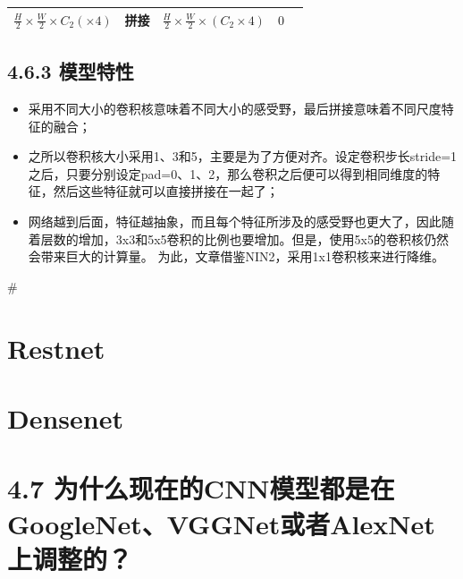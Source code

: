 \begin{longtable}[]{ ccccc }
\begin{minipage}[t]{0.15\columnwidth}
\(\frac{H}{2}\times\frac{W}{2}\times{C_2}(\times4)\)\strut
\end{minipage} & \begin{minipage}[t]{0.17\columnwidth}\centering\strut
拼接\strut
\end{minipage} & \begin{minipage}[t]{0.16\columnwidth}\centering\strut
\(\frac{H}{2}\times\frac{W}{2}\times({C_2}\times4)\)\strut
\end{minipage} & \begin{minipage}[t]{0.22\columnwidth}\centering\strut
\(0\)\strut
\end{minipage}\tabularnewline
\bottomrule
\end{longtable}

\subsection{4.6.3 模型特性}\label{ux6a21ux578bux7279ux6027-4}

\begin{itemize}
\item
  采用不同大小的卷积核意味着不同大小的感受野，最后拼接意味着不同尺度特征的融合；
\item
  之所以卷积核大小采用1、3和5，主要是为了方便对齐。设定卷积步长stride=1之后，只要分别设定pad=0、1、2，那么卷积之后便可以得到相同维度的特征，然后这些特征就可以直接拼接在一起了；
\item
  网络越到后面，特征越抽象，而且每个特征所涉及的感受野也更大了，因此随着层数的增加，3x3和5x5卷积的比例也要增加。但是，使用5x5的卷积核仍然会带来巨大的计算量。
  为此，文章借鉴NIN2，采用1x1卷积核来进行降维。
\end{itemize}

\#

\section{Restnet}\label{restnet}

\section{Densenet}\label{densenet}

\section{4.7
为什么现在的CNN模型都是在GoogleNet、VGGNet或者AlexNet上调整的？}\label{ux4e3aux4ec0ux4e48ux73b0ux5728ux7684cnnux6a21ux578bux90fdux662fux5728googlenetvggnetux6216ux8005alexnetux4e0aux8c03ux6574ux7684}

